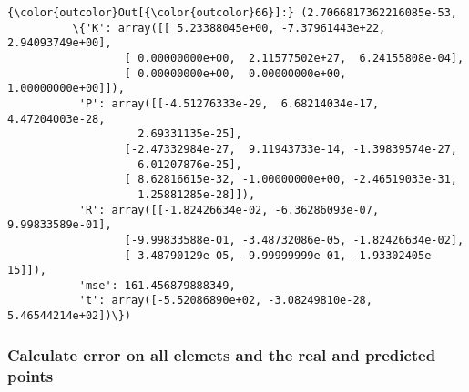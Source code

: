 \documentclass[11pt]{article}
\begin{document}
\begin{Verbatim}[commandchars=\\\{\}]
{\color{outcolor}Out[{\color{outcolor}66}]:} (2.7066817362216085e-53,
          \{'K': array([[ 5.23388045e+00, -7.37961443e+22,  2.94093749e+00],
                  [ 0.00000000e+00,  2.11577502e+27,  6.24155808e-04],
                  [ 0.00000000e+00,  0.00000000e+00,  1.00000000e+00]]),
           'P': array([[-4.51276333e-29,  6.68214034e-17,  4.47204003e-28,
                    2.69331135e-25],
                  [-2.47332984e-27,  9.11943733e-14, -1.39839574e-27,
                    6.01207876e-25],
                  [ 8.62816615e-32, -1.00000000e+00, -2.46519033e-31,
                    1.25881285e-28]]),
           'R': array([[-1.82426634e-02, -6.36286093e-07,  9.99833589e-01],
                  [-9.99833588e-01, -3.48732086e-05, -1.82426634e-02],
                  [ 3.48790129e-05, -9.99999999e-01, -1.93302405e-15]]),
           'mse': 161.456879888349,
           't': array([-5.52086890e+02, -3.08249810e-28,  5.46544214e+02])\})
\end{Verbatim}
            
    \subsubsection{Calculate error on all elemets and the real and predicted
points}\label{calculate-error-on-all-elemets-and-the-real-and-predicted-points}
\end{document}
